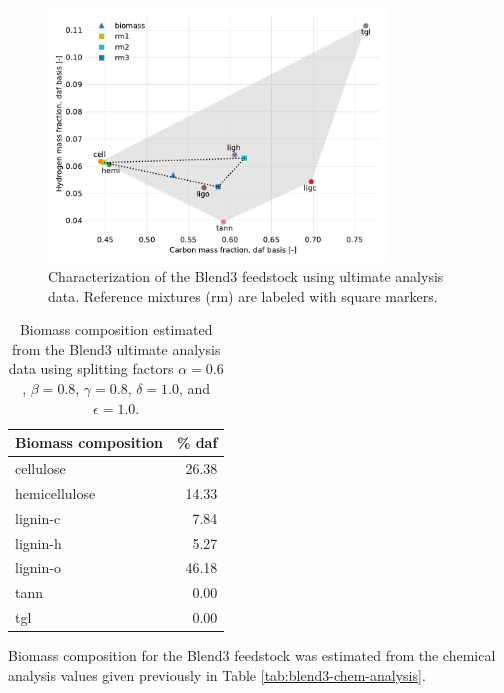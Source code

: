 \begin{figure}[H]
    \centering
    \includegraphics[width=0.8\textwidth]{figures/blend3-biocharact-ult.pdf}
    \caption{Characterization of the Blend3 feedstock using ultimate analysis data. Reference mixtures (rm) are labeled with square markers.}
    \label{fig:blend3-biocharact-ult}
\end{figure}

\begin{table}[H]
    \centering
    \caption{Biomass composition estimated from the Blend3 ultimate analysis data using splitting factors $\alpha = 0.6$, $\beta = 0.8$, $\gamma = 0.8$, $\delta = 1.0$, and $\epsilon = 1.0$.}
    \label{tab:blend3-biocomp-ult}
    \begin{tabular}{lr}
        \toprule
        Biomass composition & \% daf \\
        \midrule
        cellulose     & 26.38 \\
        hemicellulose & 14.33 \\
        lignin-c      & 7.84  \\
        lignin-h      & 5.27  \\
        lignin-o      & 46.18 \\
        tann          & 0.00  \\
        tgl           & 0.00  \\
        \bottomrule
    \end{tabular}
\end{table}

Biomass composition for the Blend3 feedstock was estimated from the chemical analysis values given previously in Table \ref{tab:blend3-chem-analysis}.

